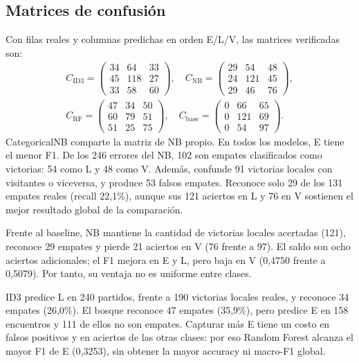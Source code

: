 \documentclass[conference]{IEEEtran}
\begin{document}
\subsection{Matrices de confusión}
Con filas reales y columnas predichas en orden E/L/V, las matrices verificadas son:
\begin{gather*}
C_{\mathrm{ID3}}=\begin{pmatrix}34&64&33\\45&118&27\\33&58&60\end{pmatrix},\quad
C_{\mathrm{NB}}=\begin{pmatrix}29&54&48\\24&121&45\\29&46&76\end{pmatrix},
\\
C_{\mathrm{RF}}=\begin{pmatrix}47&34&50\\60&79&51\\51&25&75\end{pmatrix},\quad
C_{\mathrm{base}}=\begin{pmatrix}0&66&65\\0&121&69\\0&54&97\end{pmatrix}.
\end{gather*}
CategoricalNB comparte la matriz de NB propio. En todos los modelos, E tiene el menor F1. De los 246 errores del NB, 102 son empates clasificados como victorias: 54 como L y 48 como V. Además, confunde 91 victorias locales con visitantes o viceversa, y produce 53 falsos empates. Reconoce solo 29 de los 131 empates reales (recall 22,1\%), aunque sus 121 aciertos en L y 76 en V sostienen el mejor resultado global de la comparación.

Frente al baseline, NB mantiene la cantidad de victorias locales acertadas (121), reconoce 29 empates y pierde 21 aciertos en V (76 frente a 97). El saldo son ocho aciertos adicionales; el F1 mejora en E y L, pero baja en V (0,4750 frente a 0,5079). Por tanto, su ventaja no es uniforme entre clases.

ID3 predice L en 240 partidos, frente a 190 victorias locales reales, y reconoce 34 empates (26,0\%). El bosque reconoce 47 empates (35,9\%), pero predice E en 158 encuentros y 111 de ellos no son empates. Capturar más E tiene un costo en falsos positivos y en aciertos de las otras clases: por eso Random Forest alcanza el mayor F1 de E (0,3253), sin obtener la mayor accuracy ni macro-F1 global.
\end{document}
